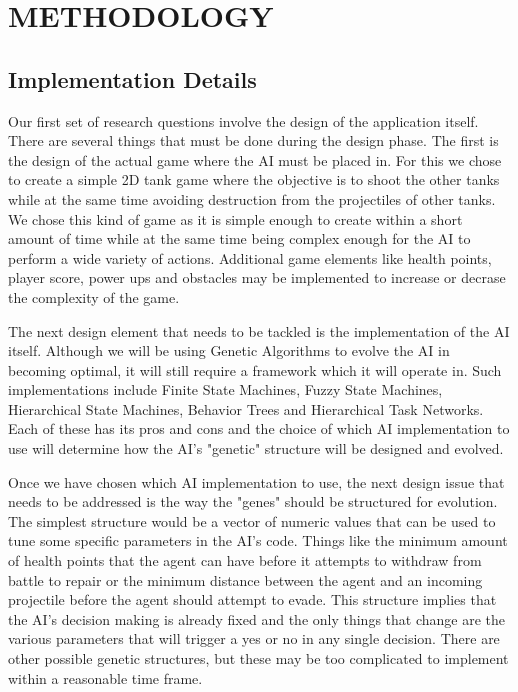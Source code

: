 \chapter{METHODOLOGY}
%
%
\section{Implementation Details}

Our first set of research questions involve the design of the application itself.
There are several things that must be done during the design phase. The first is
the design of the actual game where the AI must be placed in. For this we chose to
create a simple 2D tank game where the objective is to shoot the other tanks
while at the same time avoiding destruction from the projectiles of other tanks. We
chose this kind of game as it is simple enough to create within a short amount of time
while at the same time being complex enough for the AI to perform a wide variety of
actions. Additional game elements like health points, player score, power ups and
obstacles may be implemented to increase or decrase the complexity of the game.


The next design element that needs to be tackled is the implementation of the AI itself.
Although we will be using Genetic Algorithms to evolve the AI in becoming optimal, it
will still require a framework which it will operate in. Such implementations include
Finite State Machines, Fuzzy State Machines, Hierarchical State Machines, Behavior Trees
and Hierarchical Task Networks. Each of these has its pros and cons and the choice of
which AI implementation to use will determine how the AI's "genetic" structure will be
designed and evolved.


Once we have chosen which AI implementation to use, the next design issue that needs to
be addressed is the way the "genes" should be structured for evolution. The simplest
structure would be a vector of numeric values that can be used to tune some specific
parameters in the AI's code. Things like the minimum amount of health points that the agent can have
before it attempts to withdraw from battle to repair or the minimum distance between the
agent and an incoming projectile before the agent should attempt to evade. This structure
implies that the AI's decision making is already fixed and the only things that change
are the various parameters that will trigger a yes or no in any single decision. There
are other possible genetic structures, but these may be too complicated to implement
within a reasonable time frame.